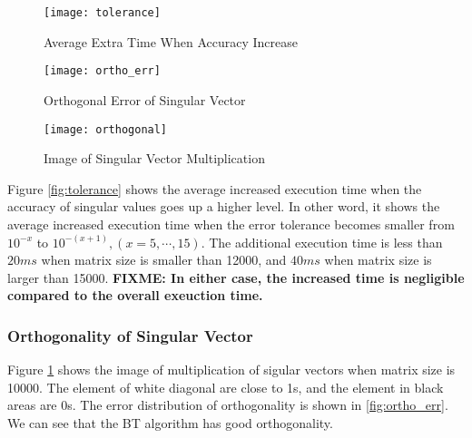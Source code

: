 \begin{figure}[hbpt]
\vspace{-0.3in}
\begin{minipage}[t]{0.33\linewidth}
\centering
\texttt{[image: tolerance]}
\vspace{-0.1in}
\caption{Average Extra Time When Accuracy Increase}
\label{fig:tolerance}
\end{minipage}%
\begin{minipage}[t]{0.33\linewidth}
\centering
\texttt{[image: ortho\_err]}
\vspace{-0.1in}
\caption{Orthogonal Error of Singular Vector}
\label{fig:ortho_err}
\end{minipage}
\begin{minipage}[t]{0.33\linewidth}
\centering
\texttt{[image: orthogonal]}
\vspace{-0.1in}
\caption{Image of Singular Vector Multiplication}
\label{fig:ortho_img}
\end{minipage}
\vspace{-0.2in}
\end{figure}
Figure \ref{fig:tolerance} shows the average increased execution time when the accuracy of singular values goes up a higher level.
In other word, it shows the average increased execution time when the error tolerance becomes smaller from $10^{-x}$ to $10^{-(x+1)}, (x=5,\cdots,15)$.
The additional execution time is less than $20 ms$ when matrix size is smaller than 12000, and $40 ms$ when matrix size is larger than 15000.
{\bf FIXME: In either case, the increased time is negligible compared to the overall exeuction time.}

\vspace{-0.1in}
\subsubsection{Orthogonality of Singular Vector}
\vspace{-0.1in}
Figure \ref{fig:ortho_img} shows the image of multiplication of sigular vectors when matrix size is 10000.
The element of white diagonal are close to 1s, and the element in black areas are 0s.
The error distribution of orthogonality is shown in \ref{fig:ortho_err}. We can see that the BT algorithm has good orthogonality.
